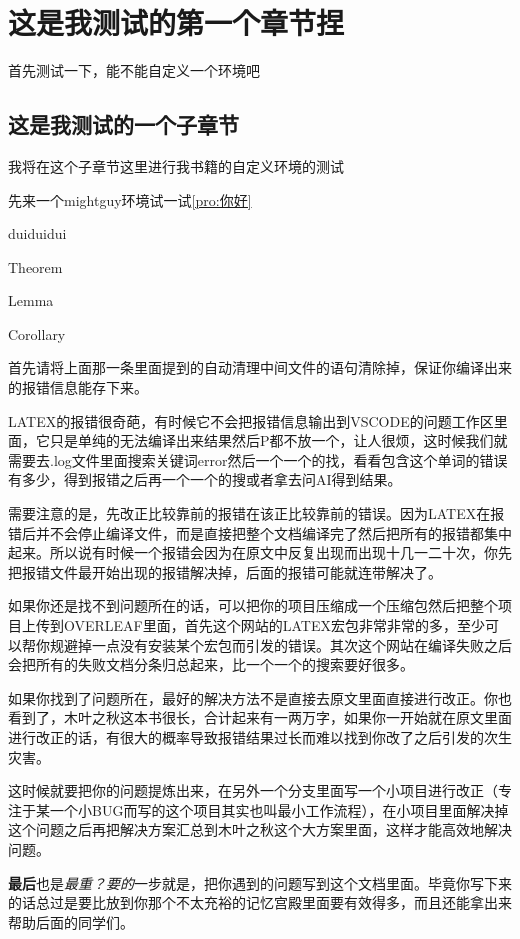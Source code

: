 \documentclass[lang=cn,10pt]{elegantbook}
\begin{document}
\tableofcontents

\chapter{这是我测试的第一个章节捏}
首先测试一下，能不能自定义一个环境吧~

\section{这是我测试的一个子章节}

我将在这个子章节这里进行我书籍的自定义环境的测试

先来一个mightguy环境试一试\ref{pro:你好}

\begin{proposition}\label{pro:你好}
    duiduidui
\end{proposition}

\begin{theorem}
    Theorem
\end{theorem}

\begin{lemma}
    Lemma
\end{lemma}

\begin{corollary}
    Corollary
\end{corollary}
\begin{mightguy}
    首先请将上面那一条里面提到的自动清理中间文件的语句清除掉，保证你编译出来的报错信息能存下来。

    LATEX的报错很奇葩，有时候它不会把报错信息输出到VSCODE的问题工作区里面，它只是单纯的无法编译出来结果然后P都不放一个，让人很烦，这时候我们就需要去.log文件里面搜索关键词error然后一个一个的找，看看包含这个单词的错误有多少，得到报错之后再一个一个的搜或者拿去问AI得到结果。

    需要注意的是，先改正比较靠前的报错在该正比较靠前的错误。因为LATEX在报错后并不会停止编译文件，而是直接把整个文档编译完了然后把所有的报错都集中起来。所以说有时候一个报错会因为在原文中反复出现而出现十几一二十次，你先把报错文件最开始出现的报错解决掉，后面的报错可能就连带解决了。

    如果你还是找不到问题所在的话，可以把你的项目压缩成一个压缩包然后把整个项目上传到OVERLEAF里面，首先这个网站的LATEX宏包非常非常的多，至少可以帮你规避掉一点没有安装某个宏包而引发的错误。其次这个网站在编译失败之后会把所有的失败文档分条归总起来，比一个一个的搜索要好很多。

    如果你找到了问题所在，最好的解决方法不是直接去原文里面直接进行改正。你也看到了，木叶之秋这本书很长，合计起来有一两万字，如果你一开始就在原文里面进行改正的话，有很大的概率导致报错结果过长而难以找到你改了之后引发的次生灾害。

    这时候就要把你的问题提炼出来，在另外一个分支里面写一个小项目进行改正（专注于某一个小BUG而写的这个项目其实也叫最小工作流程），在小项目里面解决掉这个问题之后再把解决方案汇总到木叶之秋这个大方案里面，这样才能高效地解决问题。

    \textbf{最后}也是\textit{最重？要的}一步就是，把你遇到的问题写到这个文档里面。毕竟你写下来的话总过是要比放到你那个不太充裕的记忆宫殿里面要有效得多，而且还能拿出来帮助后面的同学们。
\end{mightguy}



\end{document}
